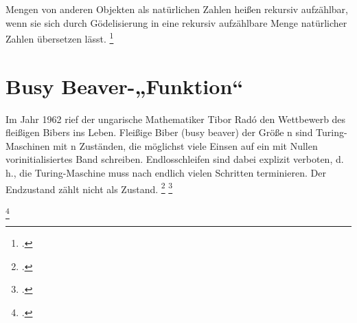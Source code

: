 \documentclass{lehramt-informatik-haupt}
\begin{document}
Mengen von anderen Objekten als natürlichen Zahlen heißen rekursiv
aufzählbar, wenn sie sich durch Gödelisierung in eine rekursiv
aufzählbare Menge natürlicher Zahlen übersetzen lässt.
\footcite{wiki:rekursiv-aufzaehlbar}

%

\section{Busy Beaver-„Funktion“}

Im Jahr 1962 rief der ungarische Mathematiker Tibor Radó den Wettbewerb
des ﬂeißigen Bibers ins Leben. Fleißige Biber (busy beaver) der Größe n
sind Turing-Maschinen mit n Zuständen, die möglichst viele Einsen auf
ein mit Nullen vorinitialisiertes Band schreiben.
Endlosschleifen sind dabei explizit verboten, d.\,h., die Turing-Maschine
muss nach endlich vielen Schritten terminieren. Der Endzustand zählt
nicht als Zustand.
\footcite[Seite 337]{hoffmann}
\footcite{wiki:busy-beaver}

\footcite[Seite 26]{theo:fs:4}
\literatur
\end{document}
